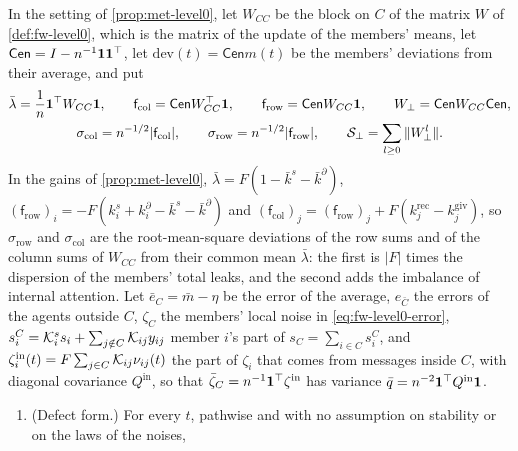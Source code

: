\begin{theorem}\label{thm:apx-level0}
In the setting of \cref{prop:met-level0}, let $W_{CC}$ be the block on $C$ of the matrix $W$ of \cref{def:fw-level0}, which is the matrix of the update of the members' means, let $\mathsf{Cen}=I-n^{-1}\mathbf{1}\mathbf{1}^\top$, let $\mathrm{dev}(t)=\mathsf{Cen}m(t)$ be the members' deviations from their average, and put
\begin{equation}\label{eq:apx-level0-rates}
\begin{gathered}
\bar\lambda=\frac1n\mathbf{1}^\top W_{CC}\mathbf{1},\qquad\mathsf f_{\mathrm{col}}=\mathsf{Cen}W_{CC}^\top\mathbf{1},\qquad\mathsf f_{\mathrm{row}}=\mathsf{Cen}W_{CC}\mathbf{1},\qquad W_\perp=\mathsf{Cen}W_{CC}\mathsf{Cen},\\
\sigma_{\mathrm{col}}=n^{-1/2}\lvert\mathsf f_{\mathrm{col}}\rvert,\qquad\sigma_{\mathrm{row}}=n^{-1/2}\lvert\mathsf f_{\mathrm{row}}\rvert,\qquad\mathcal S_\perp=\sum_{l\ge0}\Vert W_\perp^l\Vert .
\end{gathered}
\end{equation}
In the gains of \cref{prop:met-level0}, $\bar\lambda=F(1-\bar k^s-\bar k^\partial)$, $(\mathsf f_{\mathrm{row}})_i=-F(k^s_i+k^\partial_i-\bar k^s-\bar k^\partial)$ and $(\mathsf f_{\mathrm{col}})_j=(\mathsf f_{\mathrm{row}})_j+F(k^{\mathrm{rec}}_j-k^{\mathrm{giv}}_j)$, so $\sigma_{\mathrm{row}}$ and $\sigma_{\mathrm{col}}$ are the root-mean-square deviations of the row sums and of the column sums of $W_{CC}$ from their common mean $\bar\lambda$: the first is $\lvert F\rvert$ times the dispersion of the members' total leaks, and the second adds the imbalance of internal attention. Let $\bar e_C=\bar m-\eta$ be the error of the average, $e_{\bar C}$ the errors of the agents outside $C$, $\zeta_C$ the members' local noise in \eqref{eq:fw-level0-error}, $s^C_i=\mathcal{K}^s_is_i+\sum_{j\notin C}\mathcal{K}_{ij}y_{ij}$ member $i$'s part of $s_C=\sum_{i\in C}s^C_i$, and $\zeta^{\mathrm{in}}_i(t)=F\sum_{j\in C}\mathcal{K}_{ij}\nu_{ij}(t)$ the part of $\zeta_i$ that comes from messages inside $C$, with diagonal covariance $Q^{\mathrm{in}}$, so that $\bar\zeta_C=n^{-1}\mathbf{1}^\top\zeta^{\mathrm{in}}$ has variance $\bar q=n^{-2}\mathbf{1}^\top Q^{\mathrm{in}}\mathbf{1}$.
\begin{enumerate}
\item[(a)] (Defect form.) For every $t$, pathwise and with no assumption on stability or on the laws of the noises,
\begin{equation}\label{eq:apx-level0-defect}
\begin{gathered}

\end{gathered}
\end{equation}
\end{enumerate}
\end{theorem}
